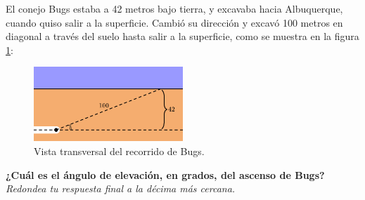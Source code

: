 El conejo Bugs estaba a 42 metros bajo tierra, y excavaba hacia Albuquerque, cuando quiso salir
a la superficie. Cambió su dirección y excavó 100 metros en diagonal a través del suelo hasta salir
a la superficie, como se muestra en la figura \ref{fig:bugs}:

\begin{figure}[H]
    \begin{center}
        \includegraphics[width=0.5\textwidth]{../images/bugs.png}
    \end{center}
    \caption{Vista transversal del recorrido de Bugs.}
    \label{fig:bugs}
\end{figure}
\textbf{¿Cuál es el ángulo de elevación, en grados, del ascenso de Bugs?}\\
\textit{Redondea tu respuesta final a la décima más cercana.}